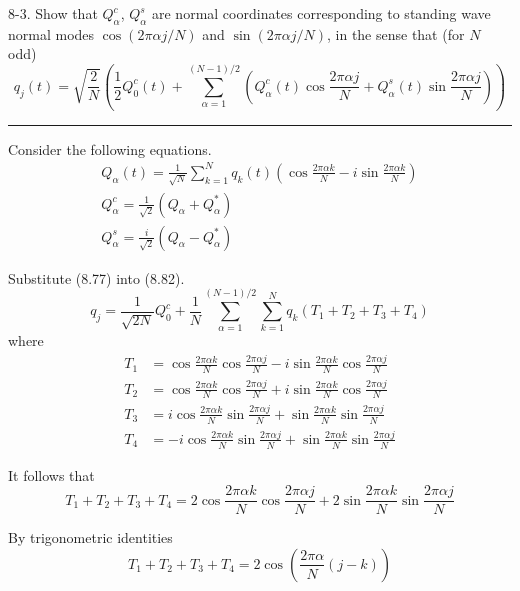\documentclass[12pt]{article}
\begin{document}
8-3.
Show that $Q_\alpha^c$, $Q_\alpha^s$ are normal coordinates
corresponding to standing wave normal modes
$\cos(2\pi\alpha j/N)$ and $\sin(2\pi\alpha j/N)$,
in the sense that (for $N$ odd)
\begin{equation*}
q_j(t)=
\sqrt{\frac{2}{N}}\left(
\frac{1}{2}Q_0^c(t)
+\sum_{\alpha=1}^{(N-1)/2}
\left(
Q_\alpha^c(t)\cos\frac{2\pi\alpha j}{N}
+Q_\alpha^s(t)\sin\frac{2\pi\alpha j}{N}
\right)
\right)
\tag{8.82}
\end{equation*}

\bigskip
\hrule

\bigskip
Consider the following equations.
\begin{gather*}
Q_\alpha(t)=\frac{1}{\sqrt N}\sum_{k=1}^Nq_k(t)
\left(
\cos\frac{2\pi\alpha k}{N}-i\sin\frac{2\pi\alpha k}{N}
\right)
\tag{8.77}
\\
Q_\alpha^c=\frac{1}{\sqrt2}(Q_\alpha+Q_\alpha^*)
\tag{8.79}
\\
Q_\alpha^s=\frac{i}{\sqrt2}(Q_\alpha-Q_\alpha^*)
\tag{8.80}
\end{gather*}

Substitute (8.77) into (8.82).
\begin{equation*}
q_j=
\frac{1}{\sqrt{2N}}Q_0^c
+
\frac{1}{N}
\sum_{\alpha=1}^{(N-1)/2}
\sum_{k=1}^N
q_k(T_1+T_2+T_3+T_4)
\tag{1}
\end{equation*}
where
\begin{align*}
T_1&=\cos\frac{2\pi\alpha k}{N}\cos\frac{2\pi\alpha j}{N}
-i\sin\frac{2\pi\alpha k}{N}\cos\frac{2\pi\alpha j}{N}
\\
T_2&=\cos\frac{2\pi\alpha k}{N}\cos\frac{2\pi\alpha j}{N}
+i\sin\frac{2\pi\alpha k}{N}\cos\frac{2\pi\alpha j}{N}
\\
T_3&=i\cos\frac{2\pi\alpha k}{N}\sin\frac{2\pi\alpha j}{N}
+\sin\frac{2\pi\alpha k}{N}\sin\frac{2\pi\alpha j}{N}
\\
T_4&=-i\cos\frac{2\pi\alpha k}{N}\sin\frac{2\pi\alpha j}{N}
+\sin\frac{2\pi\alpha k}{N}\sin\frac{2\pi\alpha j}{N}
\end{align*}

It follows that
\begin{equation*}
T_1+T_2+T_3+T_4=
2\cos\frac{2\pi\alpha k}{N}\cos\frac{2\pi\alpha j}{N}
+2\sin\frac{2\pi\alpha k}{N}\sin\frac{2\pi\alpha j}{N}
\end{equation*}

By trigonometric identities
\begin{equation*}
T_1+T_2+T_3+T_4=2\cos\left(\frac{2\pi\alpha}{N}(j-k)\right)
\tag{2}
\end{equation*}
\end{document}
